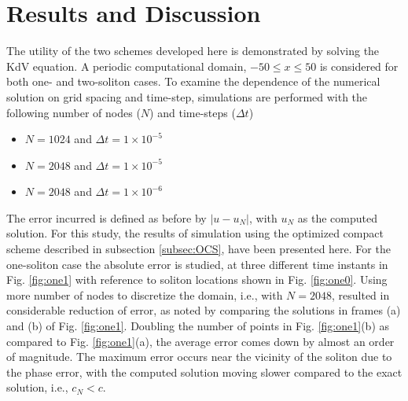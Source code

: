 \section{Results and Discussion}
\label{sec:res}
The utility of the two schemes developed here is demonstrated by solving the KdV equation. A periodic computational domain, $-50\leq x \leq 50$ is 
considered for both one- and two-soliton cases. To examine the dependence of the numerical solution on grid spacing and time-step, simulations are performed with the following number of nodes ($N$) and time-steps ($\Delta t$)
\begin{itemize}
  \item $N=1024$ and $\Delta t = 1 \times 10^{-5}$
  \item $N=2048$ and $\Delta t = 1 \times 10^{-5}$
  \item $N=2048$ and $\Delta t = 1 \times 10^{-6}$
\end{itemize}
The error incurred is defined as before by $|u - u_N|$, with $u_N$ as the computed solution. For this study, the results of simulation using the optimized compact scheme described in subsection \ref{subsec:OCS}, have been presented here.
For the one-soliton case the absolute error is studied, at three different time instants in Fig. \ref{fig:one1} with reference to soliton locations shown in Fig. \ref{fig:one0}.
Using more number of nodes to discretize the domain, i.e., with $N=2048$, resulted in considerable reduction of error, as noted by comparing the 
solutions in frames (a) and (b) of Fig. \ref{fig:one1}.  Doubling the number of points in Fig. 
\ref{fig:one1}(b) as compared to Fig. \ref{fig:one1}(a), the average error comes down by almost an order of magnitude. The maximum error occurs
near the vicinity of the soliton due to the phase error, with the computed solution moving slower compared to the exact solution, i.e., $c_N < c$. 

